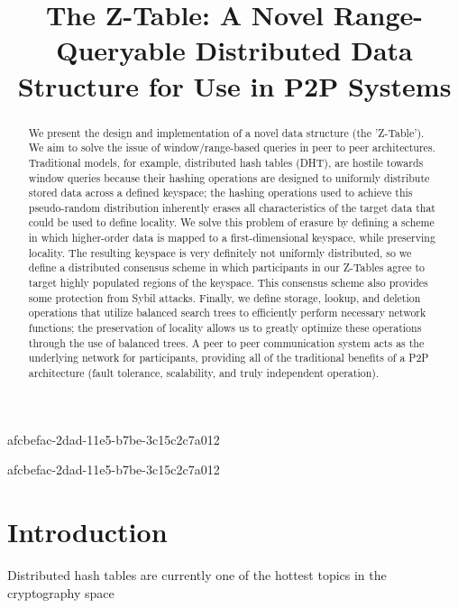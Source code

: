 \documentclass[12pt]{article}
\title{The Z-Table: A Novel Range-Queryable Distributed Data Structure for Use in P2P Systems}
\begin{document}
\maketitle

afcbefac-2dad-11e5-b7be-3c15c2c7a012\begin{abstract}
We present the design and implementation of a novel data structure (the 'Z-Table'). We aim to solve the issue of window/range-based queries in peer to peer architectures. Traditional models, for example,  distributed hash tables (DHT), are hostile towards window queries because their hashing operations are designed to uniformly distribute stored data across a defined keyspace; the hashing operations used to achieve this pseudo-random distribution inherently erases all characteristics of the target data that could be used to define locality. We solve this problem of erasure by defining a scheme in which higher-order data is mapped to a first-dimensional keyspace, while preserving locality. The resulting keyspace is very definitely not uniformly distributed, so we define a distributed consensus scheme in which participants in our Z-Tables agree to target highly populated regions of the keyspace. This consensus scheme also provides some protection from Sybil attacks. Finally, we define storage, lookup, and deletion operations that utilize balanced search trees to efficiently perform necessary network functions; the preservation of locality allows us to greatly optimize these operations through the use of balanced trees. A peer to peer communication system acts as the underlying network for participants, providing all of the traditional benefits of a P2P architecture (fault tolerance, scalability, and truly independent operation).
\end{abstract}
afcbefac-2dad-11e5-b7be-3c15c2c7a012

\newpage
\section{Introduction}
Distributed hash tables are currently one of the hottest topics in the cryptography space~\cite{Stoica:2001dj,Rowstron:2001ea,Ratnasamy:2001wn}

\printbibliography
\end{document}
